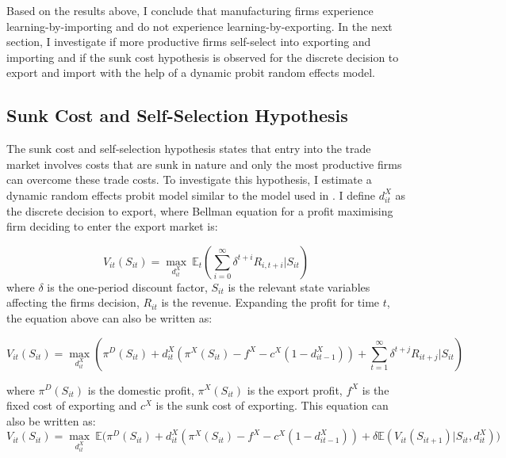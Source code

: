 \documentclass[12pt]{article}
\begin{document}
Based on the results above,  I conclude that manufacturing firms experience learning-by-importing and
do not experience learning-by-exporting. 
In the next section, I investigate if more productive firms self-select into
exporting and importing and if the sunk cost hypothesis is observed for
the discrete decision to export and import with the help of a dynamic probit
random effects model. 
\subsection{Sunk Cost and Self-Selection Hypothesis }\label{sec:ss}

The sunk cost and self-selection hypothesis states that entry into the trade market
involves   costs that are sunk in nature and only the most productive firms can
overcome these trade costs. To investigate this hypothesis, I
estimate a dynamic random effects probit model similar to the model used
in \textcite{roberts1997decision}. I define $d_{it}^{X}$ as the discrete
decision to export, where
 Bellman equation for a profit maximising firm deciding to enter the
 export market is:

 
\begin{equation}
V_{it}(S_{it})= \underset{d_{it}^{X}}{\max}\:  \mathbb{E}_{t}(\sum_{i=0}^{\infty} \delta^{t+i}R_{i,t+i}|S_{it})
\end{equation}
 where $\delta$ is the one-period discount factor, $S_{it}$ is the
 relevant state variables affecting the firms decision, $R_{it}$ is
 the revenue. Expanding the profit for time $t$, the equation above can also be written as:
 
\begin{equation}
V_{it}(S_{it})= \underset{d_{it}^{X}}{\max} (\pi^{D}(S_{it}) + d_{it}^{X}(\pi^{X}(S_{it})- f^{X} -
c^{X}(1-d_{it-1}^{X}))  + \sum_{t=1}^{\infty} \delta^{t+j}R_{it+j}|S_{it})
\end{equation}

where $\pi^{D}(S_{it})$ is the domestic profit, $\pi^{X}(S_{it})$ is the export
profit, $f^{X}$ is the fixed cost of exporting and $c^{X}$ is the sunk
cost of exporting. This equation can also be written as:
\begin{equation}
V_{it}(S_{it})= \underset{d_{it}^{X}}{\max} \:\mathbb{E}
\Big(\pi^{D}(S_{it}) + d_{it}^{X}(\pi^{X}(S_{it}) - f^{X} -
c^{X}(1-d_{it-1}^{X}))  + \delta \mathbb{E} (V_{it}(S_{it+1})|S_{it},
d_{it}^{X}) \Big)
\end{equation}
\end{document}
